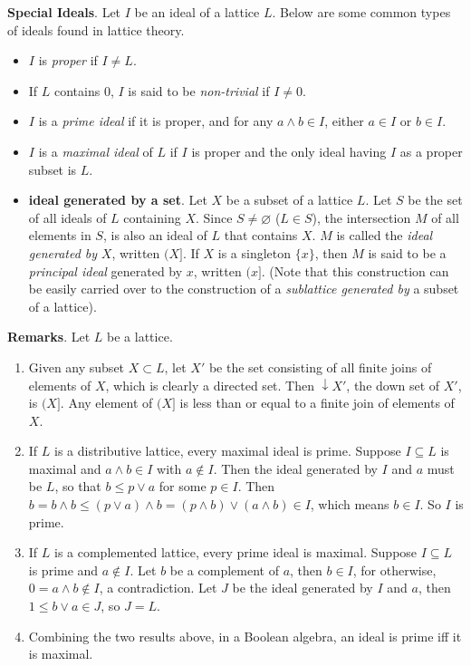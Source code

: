 \documentclass[12pt]{article}
\newcommand{\down}{\downarrow\!\!}
\begin{document}
\textbf{Special Ideals}.  Let $I$ be an ideal of a lattice $L$.  Below are some common types of ideals found in lattice theory.
\begin{itemize}
\item $I$ is \emph{proper} if $I\ne L$.
\item If $L$ contains $0$, $I$ is said to be \emph{non-trivial} if $I\ne 0$.
\item $I$ is a \emph{prime ideal} if it is proper, and for any $a\wedge b\in I$, either $a\in I$ or $b\in I$.
\item $I$ is a \emph{maximal ideal} of $L$ if $I$ is proper and the only ideal having $I$ as a proper subset is $L$. 
\item \textbf{ideal generated by a set}.  Let $X$ be a subset of a lattice $L$.  Let $S$ be the set of all ideals of $L$ containing $X$.  Since $S\ne\varnothing$ ($L\in S$), the intersection $M$ of all elements in $S$, is also an ideal of $L$ that contains $X$.  $M$ is called the \emph{ideal generated by} $X$, written $(X]$.  If $X$ is a singleton $\lbrace x\rbrace$, then $M$ is said to be a \emph{principal ideal} generated by $x$, written $(x]$.  (Note that this construction can be easily carried over to the construction of a \emph{sublattice generated by} a subset of a lattice).
\end{itemize}
\textbf{Remarks}.  Let $L$ be a lattice.
\begin{enumerate}
\item Given any subset $X\subset L$, let $X'$ be the set consisting of all finite joins of elements of $X$, which is clearly a directed set.  Then $\down X'$, the down set of $X'$, is $(X]$.  Any element of $(X]$ is less than or equal to a finite join of elements of $X$.
\item If $L$ is a distributive lattice, every maximal ideal is prime.  Suppose $I\subseteq L$ is maximal and $a\wedge b\in I$ with $a\notin I$.  Then the ideal generated by $I$ and $a$ must be $L$, so that $b\le p\vee a$ for some $p\in I$.  Then $b=b\wedge b\le (p\vee a)\wedge b=(p\wedge b)\vee (a\wedge b)\in I$, which means $b\in I$.  So $I$ is prime.
\item If $L$ is a complemented lattice, every prime ideal is maximal.  Suppose $I\subseteq L$ is prime and $a\notin I$.  Let $b$ be a complement of $a$, then $b\in I$, for otherwise, $0=a\wedge b\notin I$, a contradiction.  Let $J$ be the ideal generated by $I$ and $a$, then $1\le b\vee a\in J$, so $J=L$.
\item Combining the two results above, in a Boolean algebra, an ideal is prime iff it is maximal.
\end{enumerate}
\end{document}
